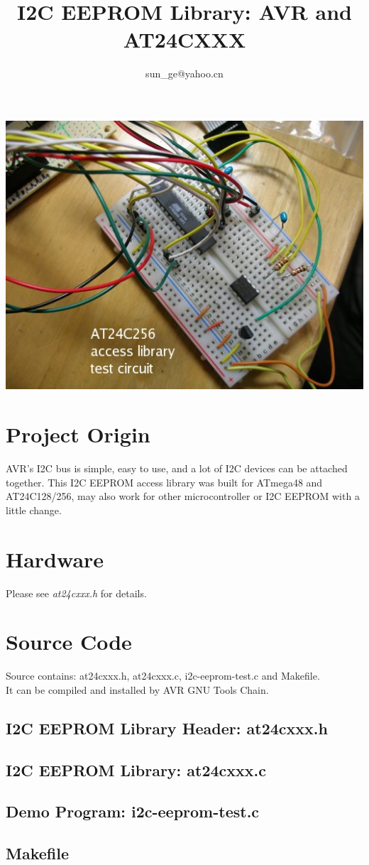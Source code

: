 \documentclass[11pt,a4paper]{article}
\title{I2C EEPROM Library: AVR and AT24CXXX}
\author{sun\_ge@yahoo.cn}
\begin{document}
\maketitle

\begin{center}
\includegraphics{i2c-eeprom.jpg}
\end{center}

\section{Project Origin}
AVR's I2C bus is simple, easy to use, and a lot of I2C devices can be attached together.
This I2C EEPROM access library was built for ATmega48 and AT24C128/256, may also
work for other microcontroller or I2C EEPROM with a little change.

\section{Hardware}

Please see {\em at24cxxx.h} for details.\\

\section{Source Code}
Source contains: at24cxxx.h, at24cxxx.c, i2c-eeprom-test.c and Makefile.\\
It can be compiled and installed by AVR GNU Tools Chain.

\subsection{I2C EEPROM Library Header: at24cxxx.h}


\subsection{I2C EEPROM Library: at24cxxx.c}


\subsection{Demo Program: i2c-eeprom-test.c}


\subsection{Makefile}

\end{document}
